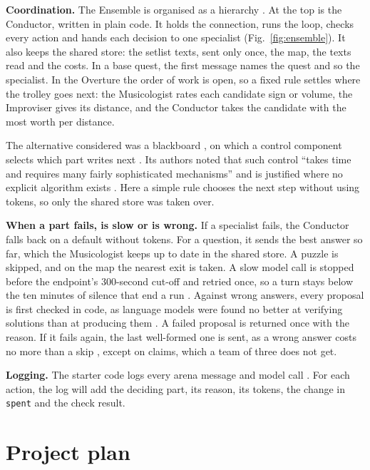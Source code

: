 \documentclass[11pt,a4paper]{article}
\newcommand\code[1]{\texttt{#1}}
\newcommand\lead[1]{\vspace{-\parskip}\textbf{#1}}
\begin{document}
\lead{Coordination.} The Ensemble is organised as a hierarchy \parencite{course-s2}. At the top is the Conductor, written in plain code. It holds the connection, runs the loop, checks every action and
hands each decision to one specialist (Fig.~\ref{fig:ensemble}). It also keeps the shared store: the setlist texts, sent only once, the map, the texts read and the costs. In a base quest, the first message names the quest and so the specialist. In the Overture the order of work is open, so a fixed rule settles where the trolley
goes next: the Musicologist rates each candidate sign or volume, the Improviser gives its distance, and the
Conductor takes the candidate with the most worth per distance.

The alternative considered was a blackboard \parencite{erman1980hearsay}, on which a control component selects which part writes next \parencite{course-s2}. Its authors noted that such control \enquote{takes time and requires many fairly sophisticated mechanisms} and is justified where no explicit algorithm exists \parencite[246]{erman1980hearsay}. Here a simple rule chooses the next step without using tokens, so only the shared store was taken over.

\lead{When a part fails, is slow or is wrong.} If a specialist fails, the Conductor falls back on a default without tokens. For a question, it sends the best answer so far, which the Musicologist keeps up to date in the shared store. A puzzle is skipped, and on the map the nearest exit is taken.
 A slow model call is stopped before the endpoint's 300-second cut-off \parencite{course-s4} and retried once, so a turn stays below the ten minutes of silence that end a run \parencite{course-api}. Against wrong answers, every proposal is first checked in code, as language models were found no better at verifying solutions than at producing them \parencite{kambhampati2024position}. A failed proposal is returned once with the reason. If it fails again, the last well-formed one is sent, as a wrong answer costs no more than a skip \parencite{course-api}, except on claims, which a team of three does not get.

\lead{Logging.} The starter code logs every arena message and model call \parencite{course-s4}. For each action, the log will add the deciding part, its reason, its tokens, the change in \code{spent} and the check result.

\section{Project plan}
\end{document}
